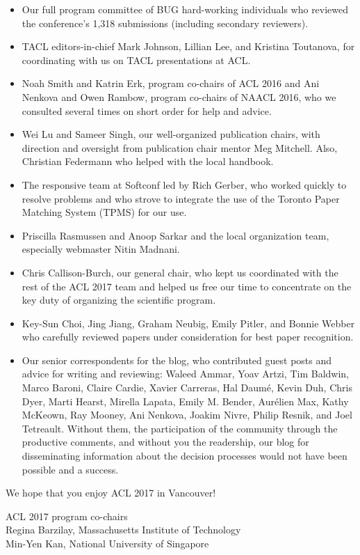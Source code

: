 \begin{itemize}
\item Our full program committee of BUG hard-working individuals who
  reviewed the conference’s 1,318 submissions (including secondary
  reviewers).
\item TACL editors-in-chief Mark Johnson, Lillian Lee, and Kristina
  Toutanova, for coordinating with us on TACL presentations at ACL.
\item Noah Smith and Katrin Erk, program co-chairs of ACL 2016 and Ani
  Nenkova and Owen Rambow, program co-chairs of NAACL 2016, who we
  consulted several times on short order for help and advice.
\item Wei Lu and Sameer Singh, our well-organized publication chairs,
  with direction and oversight from publication chair mentor Meg
  Mitchell.  Also, Christian Federmann who helped with the local
  handbook.
\item The responsive team at Softconf led by Rich Gerber, who worked
  quickly to resolve problems and who strove to integrate the use of
  the Toronto Paper Matching System (TPMS) for our use.
\item Priscilla Rasmussen and Anoop Sarkar and the local organization
  team, especially webmaster Nitin Madnani.
\item Chris Callison-Burch, our general chair, who kept us
  coordinated with the rest of the ACL 2017 team and helped us free
  our time to concentrate on the key duty of organizing the scientific
  program.
\item Key-Sun Choi, Jing Jiang, Graham Neubig, Emily Pitler, and
  Bonnie Webber who carefully reviewed papers under consideration for
  best paper recognition.
\item Our senior correspondents for the blog, who contributed guest
  posts and advice for writing and reviewing: Waleed Ammar, Yoav
  Artzi, Tim Baldwin, Marco Baroni, Claire Cardie, Xavier Carreras,
  Hal Daumé, Kevin Duh, Chris Dyer, Marti Hearst, Mirella Lapata,
  Emily M. Bender, Aurélien Max, Kathy McKeown, Ray Mooney, Ani
  Nenkova, Joakim Nivre, Philip Resnik, and Joel Tetreault.  Without
  them, the participation of the community through the productive
  comments, and without you the readership, our blog for disseminating
  information about the decision processes would not have been
  possible and a success.
\end{itemize}

We hope that you enjoy ACL 2017 in Vancouver!

\noindent ACL 2017 program co-chairs\\
Regina Barzilay, Massachusetts Institute of Technology\\
Min-Yen Kan, National University of Singapore
